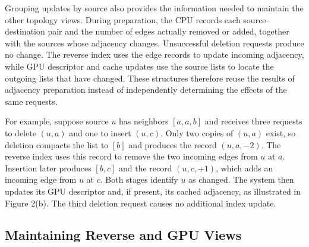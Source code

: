 Grouping updates by source also provides the information needed to maintain the other topology views. During preparation, the CPU records each source–destination pair and the number of edges actually removed or added, together with the sources whose adjacency changes. Unsuccessful deletion requests produce no change. The reverse index uses the edge records to update incoming adjacency, while GPU descriptor and cache updates use the source lists to locate the outgoing lists that have changed. These structures therefore reuse the results of adjacency preparation instead of independently determining the effects of the same requests.

For example, suppose source $u$ has neighbors $[a,a,b]$ and receives three requests to delete $(u,a)$ and one to insert $(u,c)$. Only two copies of $(u,a)$ exist, so deletion compacts the list to $[b]$ and produces the record $(u,a,-2)$. The reverse index uses this record to remove the two incoming edges from $u$ at $a$. Insertion later produces $[b,c]$ and the record $(u,c,+1)$, which adds an incoming edge from $u$ at $c$. Both stages identify $u$ as changed. The system then updates its GPU descriptor and, if present, its cached adjacency, as illustrated in Figure 2(b). The third deletion request causes no additional index update.



\subsection{Maintaining Reverse and GPU Views}

